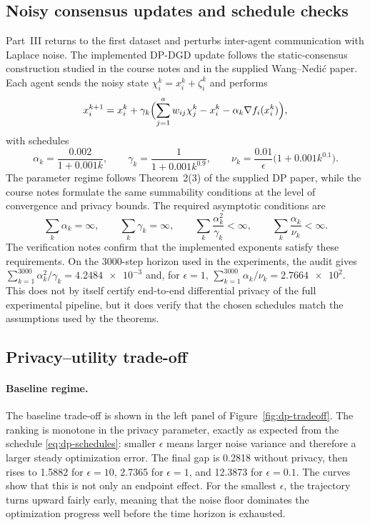 \documentclass[11pt,a4paper]{article}
\begin{document}
\subsection{Noisy consensus updates and schedule checks}
Part~III returns to the first dataset and perturbs inter-agent communication with Laplace noise. The implemented DP-DGD update follows the static-consensus construction studied in the course notes and in the supplied Wang--Nedi\'{c} paper. Each agent sends the noisy state $\chi_i^k = x_i^k + \zeta_i^k$ and performs
\begin{equation}
    x_i^{k+1}
    =
    x_i^k
    +
    \gamma_k\Bigl(\sum_{j=1}^a w_{ij}\chi_j^k - x_i^k - \alpha_k \nabla f_i(x_i^k)\Bigr),
\end{equation}
with schedules
\begin{equation}
    \alpha_k=\frac{0.002}{1+0.001k},\qquad
    \gamma_k=\frac{1}{1+0.001k^{0.9}},\qquad
    \nu_k=\frac{0.01}{\epsilon}\bigl(1+0.001k^{0.1}\bigr).
    \label{eq:dp-schedules}
\end{equation}
The parameter regime follows Theorem~2(3) of the supplied DP paper, while the course notes formulate the same summability conditions at the level of convergence and privacy bounds. The required asymptotic conditions are
\begin{equation}
    \sum_k \alpha_k = \infty,\qquad
    \sum_k \gamma_k = \infty,\qquad
    \sum_k \frac{\alpha_k^2}{\gamma_k} < \infty,\qquad
    \sum_k \frac{\alpha_k}{\nu_k} < \infty.
\end{equation}
The verification notes confirm that the implemented exponents satisfy these requirements. On the $3000$-step horizon used in the experiments, the audit gives $\sum_{k=1}^{3000}\alpha_k^2/\gamma_k=\num{4.2484e-3}$ and, for $\epsilon=1$, $\sum_{k=1}^{3000}\alpha_k/\nu_k=\num{2.7664e2}$. This does not by itself certify end-to-end differential privacy of the full experimental pipeline, but it does verify that the chosen schedules match the assumptions used by the theorems.

\subsection{Privacy--utility trade-off}
\paragraph{Baseline regime.}
The baseline trade-off is shown in the left panel of Figure~\ref{fig:dp-tradeoff}. The ranking is monotone in the privacy parameter, exactly as expected from the schedule \eqref{eq:dp-schedules}: smaller $\epsilon$ means larger noise variance and therefore a larger steady optimization error. The final gap is \num{0.2818} without privacy, then rises to \num{1.5882} for $\epsilon=10$, \num{2.7365} for $\epsilon=1$, and \num{12.3873} for $\epsilon=0.1$. The curves show that this is not only an endpoint effect. For the smallest $\epsilon$, the trajectory turns upward fairly early, meaning that the noise floor dominates the optimization progress well before the time horizon is exhausted.
\end{document}
